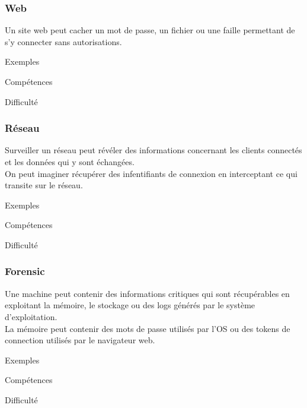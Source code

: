 \documentclass{beamer}
\begin{document}

\begin{frame}
\frametitle{Web}

Un site web peut cacher un mot de passe, un fichier ou une faille permettant de s'y connecter sans autorisations.

\begin{block}{Exemples}
\end{block}

\begin{block}{Compétences}
\end{block}

\begin{block}{Difficulté}
\end{block}

\end{frame}


\begin{frame}
\frametitle{Réseau}

Surveiller un réseau peut révéler des informations concernant les clients connectés et les données qui y sont échangées. \\
On peut imaginer récupérer des infentifiants de connexion en interceptant ce qui transite sur le réseau. 

\begin{block}{Exemples}
\end{block}

\begin{block}{Compétences}
\end{block}

\begin{block}{Difficulté}
\end{block}

\end{frame}


\begin{frame}
\frametitle{Forensic}

Une machine peut contenir des informations critiques qui sont récupérables en exploitant la mémoire, le stockage ou des logs générés par le système d'exploitation. \\
La mémoire peut contenir des mots de passe utilisés par l'OS ou des tokens de connection utilisés par le navigateur web.

\begin{block}{Exemples}
\end{block}

\begin{block}{Compétences}
\end{block}

\begin{block}{Difficulté}
\end{block}

\end{frame}
\end{document}
